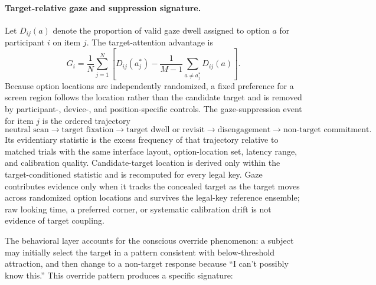 \documentclass[11pt,letterpaper]{article}
\begin{document}
\paragraph{Target-relative gaze and suppression signature.}
Let $D_{ij}(a)$ denote the proportion of valid gaze dwell assigned to option $a$ for participant $i$ on item $j$. The target-attention advantage is
\begin{equation}
G_i = \frac{1}{N}\sum_{j=1}^{N}\left[D_{ij}(a_j^*) - \frac{1}{M-1}\sum_{a\neq a_j^*}D_{ij}(a)\right].
\label{eq:gazeadvantage}
\end{equation}
Because option locations are independently randomized, a fixed preference for a screen region follows the location rather than the candidate target and is removed by participant-, device-, and position-specific controls. The gaze-suppression event for item $j$ is the ordered trajectory
\begin{equation}
\text{neutral scan} \rightarrow \text{target fixation} \rightarrow \text{target dwell or revisit} \rightarrow \text{disengagement} \rightarrow \text{non-target commitment}.
\label{eq:gazesuppression}
\end{equation}
Its evidentiary statistic is the excess frequency of that trajectory relative to matched trials with the same interface layout, option-location set, latency range, and calibration quality. Candidate-target location is derived only within the target-conditioned statistic and is recomputed for every legal key. Gaze contributes evidence only when it tracks the concealed target as the target moves across randomized option locations and survives the legal-key reference ensemble; raw looking time, a preferred corner, or systematic calibration drift is not evidence of target coupling.

The behavioral layer accounts for the conscious override phenomenon: a subject may initially select the target in a pattern consistent with below-threshold attraction, and then change to a non-target response because ``I can't possibly know this.'' This override pattern produces a specific signature:
\end{document}
